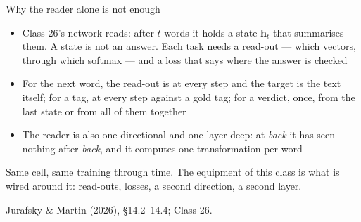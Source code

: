 \documentclass[aspectratio=169, 11pt]{beamer}
\newcommand{\srcline}[1]{%
  \par\vspace{0.25em}%
  {\scriptsize\color{mcMuted}\hfill #1\par}}
\newcommand{\src}[3]{}      %
\begin{document}
\begin{frame}{Why the reader alone is not enough}
  \src{jurafsky_slp3}{section}{14.2}
  \src{jurafsky_slp3}{section}{14.3}
  \src{jurafsky_slp3}{section}{14.4}
  \vspace{0.05em}
  {\footnotesize
  \begin{itemize}\itemsep0.25em
    \item Class 26's network reads: after $t$ words it holds a state
          $\mathbf{h}_t$ that summarises them. A state is not an answer. Each
          task needs a \alert{read-out} --- which vectors, through which
          softmax --- and a \alert{loss} that says where the answer is
          checked
    \item For the next word, the read-out is at every step and the
          target is the text itself; for a tag, at every step against a
          gold tag; for a verdict, once, from the last state or from all
          of them together
    \item The reader is also \alert{one-directional} and \alert{one layer
          deep}: at \emph{back} it has seen nothing after \emph{back}, and
          it computes one transformation per word
  \end{itemize}}
  \vspace{0.1em}
  \begin{redhighlight}
    Same cell, same training through time. The equipment of this class
    is what is wired around it: read-outs, losses, a second direction, a
    second layer.
  \end{redhighlight}
  \srcline{Jurafsky \& Martin (2026), \S14.2--14.4; Class 26.}
\end{frame}
\end{document}
